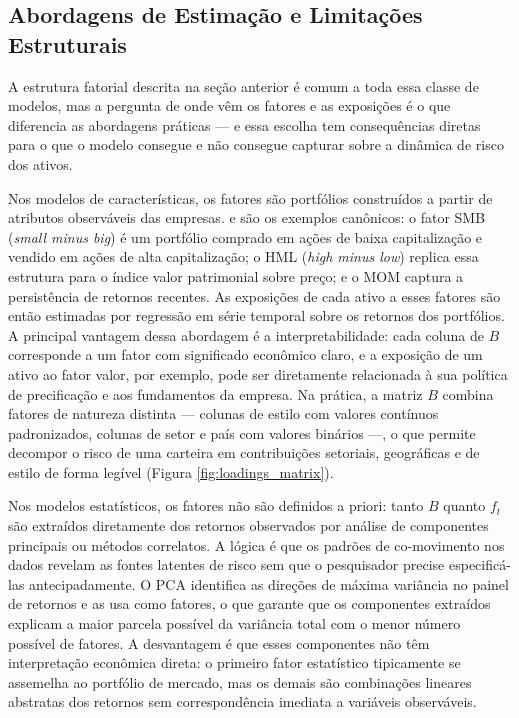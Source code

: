 \subsection{Abordagens de Estimação e Limitações Estruturais}
 
A estrutura fatorial descrita na seção anterior é comum a toda essa classe de modelos, mas a pergunta de onde vêm os fatores e as exposições é o que diferencia as abordagens práticas — e essa escolha tem consequências diretas para o que o modelo consegue e não consegue capturar sobre a dinâmica de risco dos ativos.
 
Nos modelos de características, os fatores são portfólios construídos a partir de atributos observáveis das empresas. \textcite{fama1993} e \textcite{carhart1997} são os exemplos canônicos: o fator SMB (\textit{small minus big}) é um portfólio comprado em ações de baixa capitalização e vendido em ações de alta capitalização; o HML (\textit{high minus low}) replica essa estrutura para o índice valor patrimonial sobre preço; e o MOM captura a persistência de retornos recentes. As exposições de cada ativo a esses fatores são então estimadas por regressão em série temporal sobre os retornos dos portfólios. A principal vantagem dessa abordagem é a interpretabilidade: cada coluna de $B$ corresponde a um fator com significado econômico claro, e a exposição de um ativo ao fator valor, por exemplo, pode ser diretamente relacionada à sua política de precificação e aos fundamentos da empresa. Na prática, a matriz $B$ combina fatores de natureza distinta — colunas de estilo com valores contínuos padronizados, colunas de setor e país com valores binários —, o que permite decompor o risco de uma carteira em contribuições setoriais, geográficas e de estilo de forma legível (Figura \ref{fig:loadings_matrix}).
 

 
Nos modelos estatísticos, os fatores não são definidos a priori: tanto $B$ quanto $f_t$ são extraídos diretamente dos retornos observados por análise de componentes principais ou métodos correlatos. A lógica é que os padrões de co-movimento nos dados revelam as fontes latentes de risco sem que o pesquisador precise especificá-las antecipadamente. O PCA identifica as direções de máxima variância no painel de retornos e as usa como fatores, o que garante que os componentes extraídos explicam a maior parcela possível da variância total com o menor número possível de fatores. A desvantagem é que esses componentes não têm interpretação econômica direta: o primeiro fator estatístico tipicamente se assemelha ao portfólio de mercado, mas os demais são combinações lineares abstratas dos retornos sem correspondência imediata a variáveis observáveis.
 
